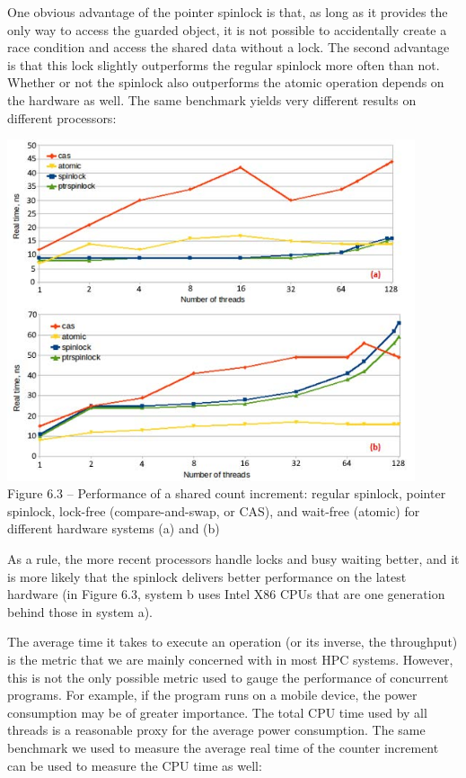 One obvious advantage of the pointer spinlock is that, as long as it provides the only way to access the guarded object, it is not possible to accidentally create a race condition and access the shared data without a lock. The second advantage is that this lock slightly outperforms the regular spinlock more often than not. Whether or not the spinlock also outperforms the atomic operation depends on the hardware as well. The same benchmark yields very different results on different processors:

\begin{center}
\includegraphics[width=0.9\textwidth]{content/2/chapter6/images/3.jpg}\\
Figure 6.3 – Performance of a shared count increment: regular spinlock, pointer spinlock, lock-free (compare-and-swap, or CAS), and wait-free (atomic) for different hardware systems (a) and (b)
\end{center}

As a rule, the more recent processors handle locks and busy waiting better, and it is more likely that the spinlock delivers better performance on the latest hardware (in Figure 6.3, system b uses Intel X86 CPUs that are one generation behind those in system a).

The average time it takes to execute an operation (or its inverse, the throughput) is the metric that we are mainly concerned with in most HPC systems. However, this is not the only possible metric used to gauge the performance of concurrent programs. For example, if the program runs on a mobile device, the power consumption may be of greater importance. The total CPU time used by all threads is a reasonable proxy for the average power consumption. The same benchmark we used to measure the average real time of the counter increment can be used to measure the CPU time as well:

